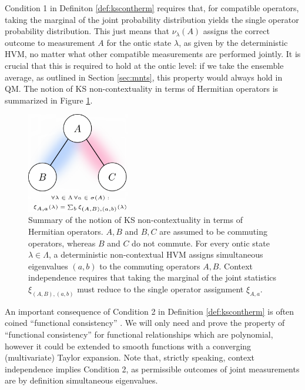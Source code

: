 Condition 1 in Definiton \ref{def:kscontherm} requires that, for compatible operators, taking the marginal of the joint probability distribution yields the single operator probability distribution. This just means that $\nu_\lambda(A)$ assigns the correct outcome to measurement $A$ for the ontic state $\lambda$, as given by the deterministic HVM, no matter what other compatible measurements are performed jointly. It is crucial that this is required to hold at the ontic level: if we take the ensemble average, as outlined in Section \ref{sec:mnts}, this property would always hold in QM. The notion of KS non-contextuality in terms of Hermitian operators is summarized in Figure \ref{fig:trianglegraph}.

\begin{figure}
    \centering
    \includegraphics[width=0.4\textwidth]{images/trianglegraph.png}
    \caption{Summary of the notion of KS non-contextuality in terms of Hermitian operators. $A,B$ and $B,C$ are assumed to be commuting operators, whereas $B$ and $C$ do not commute. For every ontic state $\lambda\in\Lambda$, a deterministic non-contextual HVM assigns simultaneous eigenvalues $(a,b)$ to the commuting operators ${A,B}$. Context independence requires that taking the marginal of the joint statistics $\xi_{(A,B),(a,b)}$ must reduce to the single operator assignment $\xi_{A,a}$.}
    \label{fig:trianglegraph}
\end{figure}

An important consequence of Condition 2 in Definition \ref{def:kscontherm} is often coined “functional consistency” \cite{Peres2002}. We will only need and prove the property of “functional consistency” for functional relationships which are polynomial, however it could be extended to smooth functions with a converging (multivariate) Taylor expansion. Note that, strictly speaking, context independence implies Condition 2, as permissible outcomes of joint measurements are by definition simultaneous eigenvalues.

